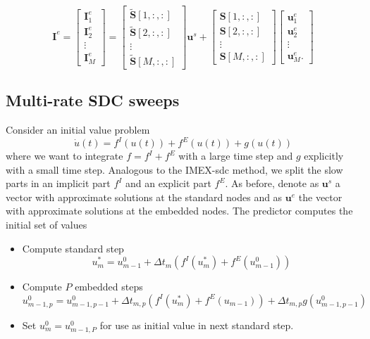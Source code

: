 \documentclass{article}
\newcommand{\ve}[1]{\mathbf{#1}}
\begin{document}
\begin{equation}
	\ve{I}^e = 
	\begin{bmatrix}
		\ve{I}^e_1 \\ \ve{I}^e_2 \\ \vdots \\ \ve{I}^e_M
	\end{bmatrix} = 
	\begin{bmatrix}
		\tilde{\ve{S}}[1,:,:] \\ \tilde{\ve{S}}[2,:,:]  \\ \vdots \\ \tilde{\ve{S}}[M,:,:] 
	\end{bmatrix}
	\ve{u}^s
	+
	\begin{bmatrix}
		\ve{S}[1,:,:] \\ \ve{S}[2,:,:] \\ \vdots \\ \ve{S}[M,:,:] 
	\end{bmatrix}
	\begin{bmatrix}
		\ve{u}^e_1 \\ \ve{u}^e_2 \\ \vdots \\ \ve{u}^e_M.
	\end{bmatrix}
\end{equation}
%
%
%
\subsection*{Multi-rate SDC sweeps}
Consider an initial value problem
\begin{equation}
	\dot{u}(t) = f^I(u(t))+f^E(u(t)) + g(u(t))
\end{equation}
where we want to integrate $f=f^I+f^E$ with a large time step and $g$ explicitly with a small time step. Analogous to the IMEX-sdc method, we split the slow parts in an implicit part $f^I$ and an explicit part $f^E$.
As before, denote as $\ve{u}^s$ a vector with approximate solutions at the standard nodes and as $\ve{u}^{e}$ the vector with approximate solutions at the embedded nodes.
The predictor computes the initial set of values
\begin{itemize}
	\item Compute standard step
	\begin{equation*}
		u^*_{m} = u^0_{m-1} + \Delta t_m \left(f^I(u^*_{m})+f^E(u^0_{m-1})\right)
	\end{equation*}
	\item Compute $P$ embedded steps
	\begin{equation*}
		u^0_{m-1,p} = u^0_{m-1,p-1} + \Delta t_{m,p} \left(f^I(u^*_{m})+f^E(u_{m-1})\right) + \Delta t_{m,p} g(u^0_{m-1,p-1})
	\end{equation*}
	\item Set $u^0_{m} = u^0_{m-1,P}$ for use as initial value in next standard step.
\end{itemize}
\end{document}
